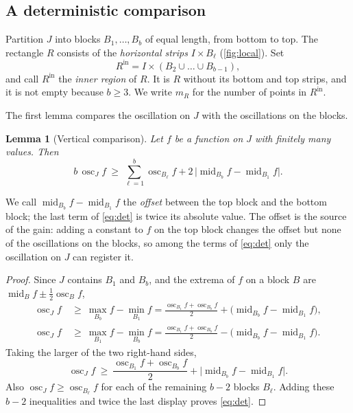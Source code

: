 \documentclass[11pt,letterpaper]{article}
\newtheorem{lemma}[theorem]{Lemma}
\newcommand{\1}{\mathbf{1}}
\newcommand{\osc}{\operatorname{osc}}
\newcommand{\midp}{\operatorname{mid}}
\newcommand{\Rin}{R^{\mathrm{in}}}
\begin{document}
\subsection{A deterministic comparison}\label{sec:blocks}

Partition $J$ into blocks $B_1,\dots,B_b$ of equal length, from bottom to top. The rectangle $R$ consists of the \emph{horizontal strips} $I\times B_\ell$ (\cref{fig:local}). Set
\[
\Rin=I\times(B_2\cup\dots\cup B_{b-1}),
\]
and call $\Rin$ the \emph{inner region} of $R$. It is $R$ without its bottom and top strips, and it is not empty because $b\ge3$. We write $m_R$ for the number of points in $\Rin$.

The first lemma compares the oscillation on $J$ with the oscillations on the blocks.

\begin{lemma}[Vertical comparison]\label{lem:comparison}
Let $f$ be a function on $J$ with finitely many values. Then
\begin{equation}\label{eq:det}
b\,\osc_Jf\ \ge\ \sum_{\ell=1}^b\osc_{B_\ell}f+2\,\bigl|\midp_{B_b}f-\midp_{B_1}f\bigr|.
\end{equation}
\end{lemma}

We call $\midp_{B_b}f-\midp_{B_1}f$ the \emph{offset} between the top block and the bottom block; the last term of \eqref{eq:det} is twice its absolute value. The offset is the source of the gain: adding a constant to $f$ on the top block changes the offset but none of the oscillations on the blocks, so among the terms of \eqref{eq:det} only the oscillation on $J$ can register it.

\begin{proof}
Since $J$ contains $B_1$ and $B_b$, and the extrema of $f$ on a block $B$ are \mbox{$\midp_Bf\pm\frac12\osc_Bf$},
\begin{align*}
\osc_Jf&\ \ge\ \max_{B_b}f-\min_{B_1}f=\frac{\osc_{B_1}f+\osc_{B_b}f}2+\bigl(\midp_{B_b}f-\midp_{B_1}f\bigr),\\
\osc_Jf&\ \ge\ \max_{B_1}f-\min_{B_b}f=\frac{\osc_{B_1}f+\osc_{B_b}f}2-\bigl(\midp_{B_b}f-\midp_{B_1}f\bigr).
\end{align*}
Taking the larger of the two right-hand sides,
\[
\osc_Jf\ \ge\ \frac{\osc_{B_1}f+\osc_{B_b}f}2+\bigl|\midp_{B_b}f-\midp_{B_1}f\bigr|.
\]
Also $\osc_Jf\ge\osc_{B_\ell}f$ for each of the remaining $b-2$ blocks $B_\ell$. Adding these $b-2$ inequalities and twice the last display proves \eqref{eq:det}.
\end{proof}
\end{document}
